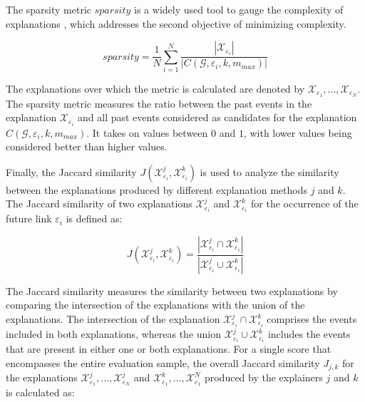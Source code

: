 The sparsity metric $sparsity$ is a widely used tool to gauge the complexity of explanations \cite{yuan_explainability_2020, amara_graphframex_2022, prado-romero_survey_2023}, which addresses the second objective of minimizing complexity.

\begin{equation}
    sparsity = \frac{1}{N} \sum_{i = 1}^N \frac{|\mathcal{X}_{\varepsilon_i}|}{|C(\mathcal{G}, \varepsilon_i, k, m_{max})|}
\end{equation}

The explanations over which the metric is calculated are denoted by $\mathcal{X}_{\varepsilon_1},...,\mathcal{X}_{\varepsilon_N}$. The sparsity metric measures the ratio between the past events in the explanation $\mathcal{X}_{\varepsilon_i}$ and all past events considered as candidates for the explanation $C(\mathcal{G}, \varepsilon_i, k, m_{max})$. It takes on values between $0$ and $1$, with lower values being considered better than higher values.

Finally, the Jaccard similarity \cite{jaccard_distribution_1912} $J(\mathcal{X}_{\varepsilon_i}^j, \mathcal{X}_{\varepsilon_i}^k)$ is used to analyze the similarity between the explanations produced by different explanation methods $j$ and $k$. The Jaccard similarity of two explanations $\mathcal{X}_{\varepsilon_i}^j$ and $\mathcal{X}_{\varepsilon_i}^k$ for the occurrence of the future link $\varepsilon_i$ is defined as:

\begin{equation}
    J(\mathcal{X}_{\varepsilon_i}^j, \mathcal{X}_{\varepsilon_i}^k) = \frac{|\mathcal{X}_{\varepsilon_i}^j \cap \mathcal{X}_{\varepsilon_i}^k|}{|\mathcal{X}_{\varepsilon_i}^j \cup \mathcal{X}_{\varepsilon_i}^k|}
\end{equation}

The Jaccard similarity measures the similarity between two explanations by comparing the intersection of the explanations with the union of the explanations. The intersection of the explanation $\mathcal{X}_{\varepsilon_i}^j \cap \mathcal{X}_{\varepsilon_i}^k$ comprises the events included in both explanations, whereas the union $\mathcal{X}_{\varepsilon_i}^j \cup \mathcal{X}_{\varepsilon_i}^k$ includes the events that are present in either one or both explanations. For a single score that encompasses the entire evaluation sample, the overall Jaccard similarity $J_{j,k}$ for the explanations $\mathcal{X}_{\varepsilon_1}^j, ..., \mathcal{X}_{\varepsilon_N}^j$ and $\mathcal{X}_{\varepsilon_1}^k,...,\mathcal{X}_{\varepsilon_1}^N$ produced by the explainers $j$ and $k$ is calculated as:

